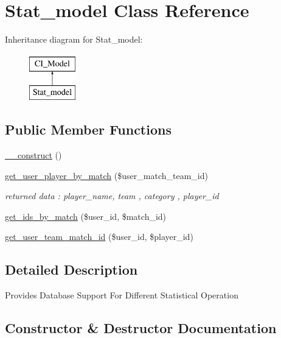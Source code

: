 \hypertarget{class_stat__model}{}\section{Stat\+\_\+model Class Reference}
\label{class_stat__model}
Inheritance diagram for Stat\+\_\+model\+:\begin{figure}[H]
\begin{center}
\leavevmode
\includegraphics[height=2.000000cm]{class_stat__model}
\end{center}
\end{figure}
\subsection*{Public Member Functions}
\begin{DoxyCompactItemize}
\item 
\hyperlink{class_stat__model_a095c5d389db211932136b53f25f39685}{\+\_\+\+\_\+construct} ()
\item 
\hyperlink{class_stat__model_aae38f450ca56fb7a815cb0eb7d170e76}{get\+\_\+user\+\_\+player\+\_\+by\+\_\+match} (\$user\+\_\+match\+\_\+team\+\_\+id)
\begin{DoxyCompactList}\small\item\em returned data \+: player\+\_\+name, team , category , player\+\_\+id \end{DoxyCompactList}\item 
\hyperlink{class_stat__model_abfa4fb201a00936dae8bfe0ee1de5def}{get\+\_\+ids\+\_\+by\+\_\+match} (\$user\+\_\+id, \$match\+\_\+id)
\item 
\hyperlink{class_stat__model_a208d97b470817f08228bb1225042e218}{get\+\_\+user\+\_\+team\+\_\+match\+\_\+id} (\$user\+\_\+id, \$player\+\_\+id)
\end{DoxyCompactItemize}


\subsection{Detailed Description}
Provides Database Support For Different Statistical Operation 

\subsection{Constructor \& Destructor Documentation}
\hypertarget{class_stat__model_a095c5d389db211932136b53f25f39685}{}
